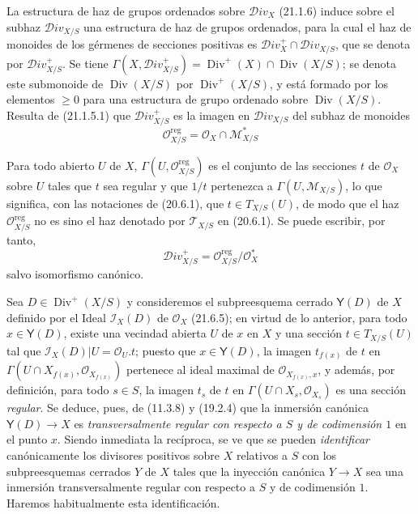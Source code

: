 \begin{env}[21.15.3]
\label{IV.21.15.3}
La estructura de haz de grupos ordenados sobre $\mathscr{D}iv_X$ (21.1.6) induce
sobre el subhaz $\mathscr{D}iv_{X/S}$ una estructura de haz de grupos
ordenados, para la cual el haz de monoides de los gérmenes de secciones positivas es
$\mathscr{D}iv_X^+\cap\mathscr{D}iv_{X/S}$, que se denota por
$\mathscr{D}iv_{X/S}^+$. Se tiene
$\Gamma(X,\mathscr{D}iv_{X/S}^+)=\operatorname{Div}^+(X)\cap
\operatorname{Div}(X/S)$; se denota este submonoide de $\operatorname{Div}(X/S)$ por
$\operatorname{Div}^+(X/S)$, y está formado por los elementos $\geq0$ para una estructura
de grupo ordenado sobre $\operatorname{Div}(X/S)$. Resulta de (21.1.5.1) que
$\mathscr{D}iv_{X/S}^+$ es la imagen en $\mathscr{D}iv_{X/S}$ del subhaz de
monoides
\[
\label{IV.21.15.3.1}
  \mathcal O_{X/S}^{\mathrm{reg}}=\mathcal O_X\cap\mathscr M_{X/S}^*
  \tag{21.15.3.1}
\]
\end{env}

Para todo abierto $U$ de $X$, $\Gamma(U,\mathcal O_{X/S}^{\mathrm{reg}})$ es
el conjunto de las secciones $t$ de $\mathcal O_X$ sobre $U$ tales que $t$ sea
regular y que $1/t$ pertenezca a $\Gamma(U,\mathscr M_{X/S})$, lo que significa,
con las notaciones de (20.6.1), que $t\in T_{X/S}(U)$, de modo que el haz
$\mathcal O_{X/S}^{\mathrm{reg}}$ no es sino el haz denotado por $\mathscr T_{X/S}$
en (20.6.1). Se puede escribir, por tanto,
\[
\label{IV.21.15.3.2}
  \mathscr{D}iv_{X/S}^+=\mathcal O_{X/S}^{\mathrm{reg}}/\mathcal O_X^*
  \tag{21.15.3.2}
\]
salvo isomorfismo canónico.

\begin{env}[21.15.3.3]
\label{IV.21.15.3.3}
Sea $D\in\operatorname{Div}^+(X/S)$ y consideremos el subpreesquema cerrado $\boldsymbol{\mathsf{Y}}(D)$
de $X$ definido por el Ideal $\mathscr I_X(D)$ de $\mathcal O_X$ (21.6.5); en virtud de
lo anterior, para todo $x\in\boldsymbol{\mathsf{Y}}(D)$, existe una vecindad abierta $U$ de $x$ en $X$
y una sección $t\in T_{X/S}(U)$ tal que
$\mathscr I_X(D)|U=\mathcal O_U.t$; puesto que $x\in\boldsymbol{\mathsf{Y}}(D)$, la imagen $t_{f(x)}$ de
$t$ en $\Gamma(U\cap X_{f(x)},\mathcal O_{X_{f(x)}})$ pertenece al ideal maximal
de $\mathcal O_{X_{f(x)},x}$, y además, por definición, para todo $s\in S$, la imagen
$t_s$ de $t$ en $\Gamma(U\cap X_s,\mathcal O_{X_s})$ es una sección
\emph{regular}. Se deduce, pues, de (11.3.8) y (19.2.4) que la inmersión canónica
$\boldsymbol{\mathsf{Y}}(D)\to X$ es \emph{transversalmente regular con respecto a $S$ y de
codimensión $1$} en el punto $x$. Siendo inmediata la recíproca, se ve que se pueden
\emph{identificar} canónicamente los divisores positivos sobre $X$ relativos a $S$ con los
subpreesquemas cerrados $Y$ de $X$ tales que la inyección canónica $Y\to X$ sea una
inmersión transversalmente regular con respecto a $S$ y de codimensión $1$. Haremos
habitualmente esta identificación.
\end{env}

